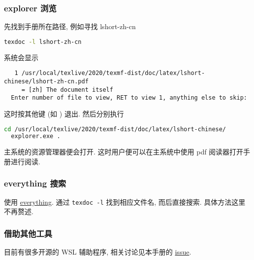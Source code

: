 \subsubsection{explorer 浏览}

先找到手册所在路径,
例如寻找 \textsf{lshort-zh-cn}
\begin{lstlisting}[language=bash]
  texdoc -l lshort-zh-cn
\end{lstlisting}
系统会显示
\begin{lstlisting}
   1 /usr/local/texlive/2020/texmf-dist/doc/latex/lshort-chinese/lshort-zh-cn.pdf
     = [zh] The document itself
  Enter number of file to view, RET to view 1, anything else to skip:
\end{lstlisting}
这时按其他键 (如 ) 退出.
然后分别执行
\begin{lstlisting}[language=bash]
  cd /usr/local/texlive/2020/texmf-dist/doc/latex/lshort-chinese/
  explorer.exe .
\end{lstlisting}
主系统的资源管理器便会打开.
这时用户便可以在主系统中使用 pdf 阅读器打开手册进行阅读.

\subsubsection{everything 搜索}

使用 \href{https://www.voidtools.com/zh-cn/}{everything}.
通过 \texttt{texdoc -l} 找到相应文件名,
而后直接搜索.
具体方法这里不再赘述.

\subsubsection{借助其他工具}

目前有很多开源的 WSL 辅助程序,
相关讨论见本手册的 \href{https://github.com/OsbertWang/install-latex/issues/13}{issue}.